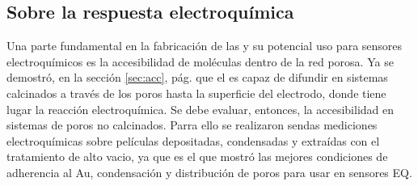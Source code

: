 	\subsection{Sobre la respuesta electroquímica}\label{sec:acc_eq}

	  Una parte fundamental en la fabricación de las \pdm\space y su potencial uso para sensores electroquímicos es la accesibilidad de moléculas dentro de la red porosa. Ya se demostró, en la sección \ref{sec:acc}, pág. \pageref{sec:acc} que el \aminorutenio\space es capaz de difundir en sistemas calcinados a través de los poros hasta la superficie del electrodo, donde tiene lugar la reacción electroquímica. Se debe evaluar, entonces,  la accesibilidad en sistemas de poros no calcinados. Parra ello se realizaron sendas mediciones electroquímicas sobre películas depositadas, condensadas y extraídas con el tratamiento de alto vacio, ya que es el que mostró las mejores condiciones de adherencia al Au, condensación y distribución de poros para usar en sensores EQ. 

